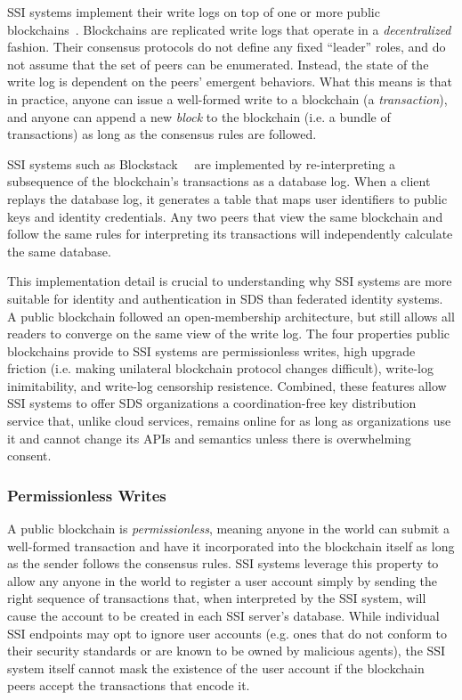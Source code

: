 SSI systems implement their write logs on top of one or more public
blockchains~\cite{bitcoin}.  Blockchains are replicated write logs that
operate in a \emph{decentralized} fashion.  Their consensus protocols do not 
define any fixed ``leader'' roles, and do not assume that the set of peers can
be enumerated.  Instead, the state of the write log is dependent on the
peers' emergent behaviors.  What this means is that in practice,
anyone can issue a well-formed write to a blockchain
(a \emph{transaction}), and anyone can append a new \emph{block} to the
blockchain (i.e. a bundle of transactions)
as long as the consensus rules are followed.

SSI systems such as Blockstack~\cite{blockstack}~\cite{blockstack-thesis}
are implemented by re-interpreting a subsequence of the blockchain's
transactions as a database log.  When a client replays the database log, it
generates a table that maps user identifiers to public keys and identity
credentials.  Any two peers that view the same blockchain and follow the
same rules for interpreting its transactions will independently
calculate the same database.

This implementation detail is crucial to understanding why SSI systems are
more suitable for identity and authentication in SDS than federated identity
systems.  A public blockchain followed an open-membership architecture, but
still allows all readers to converge on the same view of the write log.
The four properties public blockchains provide to SSI systems are
permissionless writes, high upgrade friction (i.e. making unilateral blockchain
protocol changes difficult), write-log inimitability, and write-log censorship
resistence.  Combined, these features allow SSI systems to offer SDS organizations a
coordination-free key distribution service that, unlike cloud services, remains
online for as long as organizations use it and cannot change its APIs and
semantics unless there is overwhelming consent.

\subsubsection{Permissionless Writes}

A public blockchain is \emph{permissionless}, meaning anyone in the world can submit a
well-formed transaction and have it incorporated into the blockchain itself as
long as the sender follows the consensus rules.
SSI systems leverage this property to allow any anyone in the world to register a user account
simply by sending the right sequence of transactions that, when interpreted by the SSI system, will
cause the account to be created in each SSI server's database.
While individual SSI endpoints may opt to ignore user accounts (e.g. ones that do not conform to their security
standards or are known to be owned by malicious agents), the SSI system itself cannot
mask the existence of the user account if the blockchain peers accept the
transactions that encode it.

